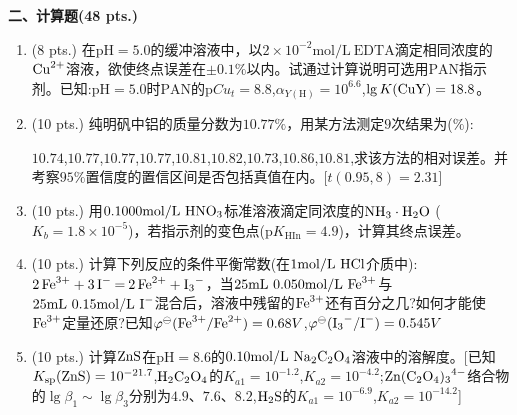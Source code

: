 \vspace{0.5cm}
\noindent\textbf{二、计算题(48 pts.)}

\begin{enumerate}[label=\arabic*., itemsep=1.5ex]
    \item (8 pts.) 在$\mathrm{pH}=5.0$的缓冲溶液中，以$2\times10^{-2}\mathrm{mol/L}\ \mathrm{EDTA}$滴定相同浓度的$\ce{Cu^{2+}}$溶液，欲使终点误差在$\pm0.1\%$以内。试通过计算说明可选用$\mathrm{PAN}$指示剂。已知:$\mathrm{pH}=5.0$时$\mathrm{PAN}$的$\mathrm{p}Cu_t=8.8$,$\alpha_{Y(\mathrm{H})}=10^{6.6}$,$\lg K(\ce{CuY})=18.8$。
    \item (10 pts.) 纯明矾中铝的质量分数为$10.77\%$，用某方法测定$9$次结果为($\%$):
    
    $10.74$,$10.77$,$10.77$,$10.77$,$10.81$,$10.82$,$10.73$,$10.86$,$10.81$,求该方法的相对误差。并考察$95\%$置信度的置信区间是否包括真值在内。[$t(0.95,8)=2.31$]
    \item (10 pts.) 用$0.1000\mathrm{mol/L}\ \ce{HNO3}$标准溶液滴定同浓度的$\ce{NH3\cdot H2O}$ ($K_b=1.8\times10^{-5}$)，若指示剂的变色点($\mathrm{p}K_{\mathrm{HIn}}=4.9$)，计算其终点误差。
    \item (10 pts.) 计算下列反应的条件平衡常数(在$1\mathrm{mol/L}\ \ce{HCl}$介质中):
    \\
    $\ce{2Fe^{3+} + 3I^- = 2Fe^{2+} + I3^-}$，当$25\mathrm{mL}\ 0.050\mathrm{mol/L}\ \ce{Fe^{3+}}$与$25\mathrm{mL}\ 0.15\mathrm{mol/L}\ \ce{I^-}$混合后，溶液中残留的$\ce{Fe^{3+}}$还有百分之几?如何才能使$\ce{Fe^{3+}}$定量还原?已知$\varphi^\ominus(\ce{Fe^{3+}/Fe^{2+}})=0.68V$,$\varphi^\ominus(\ce{I3^-/I^-})=0.545V$
    \item (10 pts.) 计算$\ce{ZnS}$在$\mathrm{pH}=8.6$的$0.10\mathrm{mol/L}\ \ce{Na2C2O4}$溶液中的溶解度。[已知$K_{\mathrm{sp}}(\ce{ZnS})=10^{-21.7}$,$\ce{H2C2O4}$的$K_{a1}=10^{-1.2}$,$K_{a2}=10^{-4.2}$;$\ce{Zn(C2O4)3^{4-}}$络合物的$\lg\beta_1\sim\lg\beta_3$分别为$4.9$、$7.6$、$8.2$,$\ce{H2S}$的$K_{a1}=10^{-6.9}$,$K_{a2}=10^{-14.2}$]
\end{enumerate}